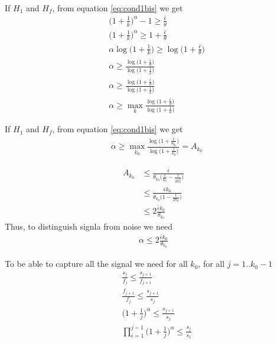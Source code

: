\documentclass{article}
\begin{document}
If $H_1$ and $H_f$, from equation \ref{eq:cond1bis} we get
\begin{align}
&\big(1+\frac{1}{k}\big)^{\alpha}-1 \geq \frac{\bar{\epsilon}}{\theta} \\
&\big(1+\frac{1}{k}\big)^{\alpha} \geq 1+\frac{\bar{\epsilon}}{\theta} \\
&\alpha\log\big(1+\frac{1}{k}\big) \geq \log\big(1+\frac{\bar{\epsilon}}{\theta}\big) \\
&\alpha \geq \frac{\log\big(1+\frac{\bar{\epsilon}}{\theta}\big)}{\log\big(1+\frac{1}{k}\big)} \\
&\alpha \geq \frac{\log\big(1+\frac{\bar{\epsilon}}{\theta}\big)}{\log\big(1+\frac{1}{k}\big)} \\
&\alpha \geq \max_{k} \frac{\log\big(1+\frac{\bar{\epsilon}}{\theta}\big)}{\log\big(1+\frac{1}{k}\big)} 
\end{align}

If $H_1$ and $H_f$, from equation \ref{eq:cond1bis} we get
\begin{align}
&\alpha \geq \max_{k_0} \frac{\log\big(1+\frac{\bar{\epsilon}}{\theta_{k_0}}\big)}{\log\big(1+\frac{1}{k_0}\big)}=A_{k_0} 
\end{align}

\begin{align}
A_{k_0} &\leq \frac{\bar{\epsilon}}{\theta_{k_0}\big(\frac{1}{k_0}-\frac{1}{2k_0^2}\big)}\\
  &\leq \frac{\bar{\epsilon}k_0}{\theta_{k_0}\big(1-\frac{1}{2k_0}\big)}\\
    &\leq 2\frac{\bar{\epsilon}k_0}{\theta_{k_0}}
\end{align}
Thus, to distinguish signla from noise we need
\begin{align}
\alpha\leq 2\frac{\bar{\epsilon}k_0}{\theta_{k_0}}
\end{align}

To be able to capture all the signal we need for all $k_0$, for all $j=1..k_0-1$
\begin{align}
&\frac{s_j}{f_j}\leq\frac{s_{j+1}}{f_{j+1}}\\
&\frac{f_{j+1}}{f_j}\leq\frac{s_{j+1}}{s_j}\\
&\big(1+\frac{1}{j}\big)^{\alpha}\leq\frac{s_{j+1}}{s_j}\\
&\prod_{i=1}^{j-1}\big(1+\frac{1}{j}\big)^{\alpha}\leq\frac{s_{j}}{s_1}\\
\end{align}
\end{document}
